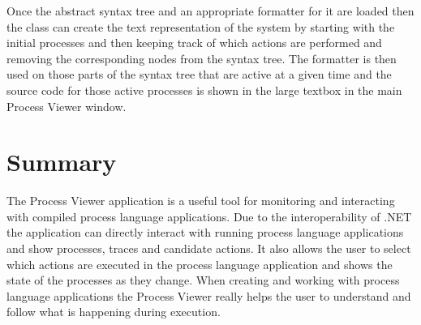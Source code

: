 	Once the abstract syntax tree and an appropriate formatter for it are loaded
	then the  class can create the text 
	representation of the system by starting with the initial processes and 
	then keeping track of which actions are performed and removing the 
	corresponding nodes from the syntax tree. The formatter is then used on those
	parts of the syntax tree that are active at a given time and the source
	code for those active processes is shown in the large textbox in the main 
	Process Viewer window.

\section{Summary}

	The Process Viewer application is a useful tool for monitoring and interacting
	with compiled process language applications. Due to the interoperability of
	.NET the application can directly interact with running process language 
	applications and show processes, traces and candidate actions. It also
	allows the user to select which actions are executed in the process language
	application and shows the state of the processes as they change. When creating
	and working with process language applications the Process Viewer really helps
	the user to understand and follow what is happening during execution.